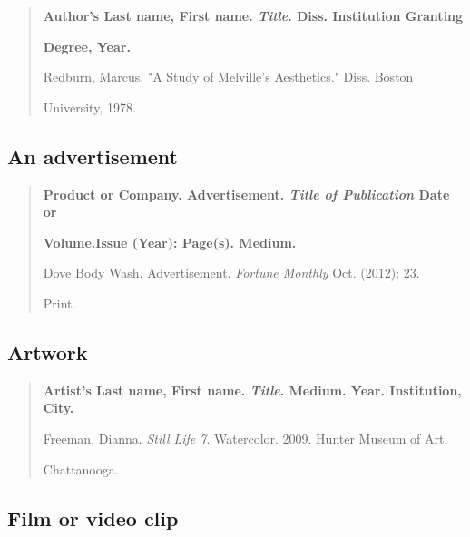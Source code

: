 \begin{quote}
\textbf{Author's Last name, First name. \emph{Title}. Diss. Institution Granting}

\hspace{.4in}\textbf{Degree, Year.}

\medskip

Redburn, Marcus. "A Study of Melville's Aesthetics." Diss. Boston 

\hspace{.4in}University, 1978.

\end{quote}


\subsection{An advertisement}

\begin{quote}
\textbf{Product or Company. Advertisement. \emph{Title of Publication} Date or}

\hspace{.4in}\textbf{Volume.Issue (Year): Page(s). Medium.}

\medskip

Dove Body Wash. Advertisement. \emph{Fortune Monthly} Oct. (2012): 23. 

\hspace{.4in}Print.


\end{quote}



\subsection{Artwork}

\begin{quote} 

\textbf{Artist's Last name, First name. \emph{Title}. Medium. Year. Institution, City.}

\medskip

Freeman, Dianna. \emph{Still Life 7}. Watercolor. 2009. Hunter Museum of Art, 

\hspace{.4in}Chattanooga.

\end{quote}

\subsection{Film or video clip}


